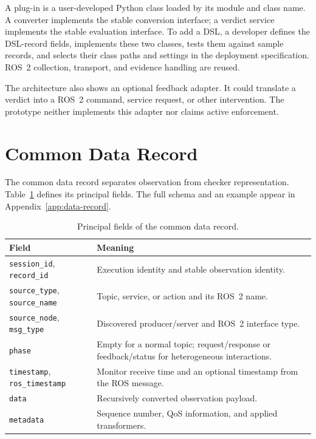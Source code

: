 A plug-in is a user-developed Python class loaded by its module and class name.
A converter implements the stable conversion interface; a verdict service
implements the stable evaluation interface. To add a DSL, a developer defines
the DSL-record fields, implements these two classes, tests them against sample
records, and selects their class paths and settings in the deployment
specification. ROS~2 collection, transport, and evidence handling are reused.

The architecture also shows an optional feedback adapter. It could translate a
verdict into a ROS~2 command, service request, or other intervention. The
prototype neither implements this adapter nor claims active enforcement.

\section{Common Data Record}\label{sec:common-record}

The common data record separates observation from checker representation.
Table~\ref{tab:data-record-fields} defines its principal fields. The full schema
and an example appear in Appendix~\ref{app:data-record}.

\begin{table}[htbp]
\centering
\caption{Principal fields of the common data record.}
\label{tab:data-record-fields}
\begin{tabular}{p{}p{}}
\toprule
\textbf{Field} & \textbf{Meaning}\\
\midrule
\texttt{session\_id}, \texttt{record\_id} & Execution identity and stable
observation identity.\\
\texttt{source\_type}, \texttt{source\_name} & Topic, service, or action and
its ROS~2 name.\\
\texttt{source\_node}, \texttt{msg\_type} & Discovered producer/server and
ROS~2 interface type.\\
\texttt{phase} & Empty for a normal topic; request/response or feedback/status
for heterogeneous interactions.\\
\texttt{timestamp}, \texttt{ros\_timestamp} & Monitor receive time and an
optional timestamp from the ROS message.\\
\texttt{data} & Recursively converted observation payload.\\
\texttt{metadata} & Sequence number, QoS information, and applied
transformers.\\
\bottomrule
\end{tabular}
\end{table}

